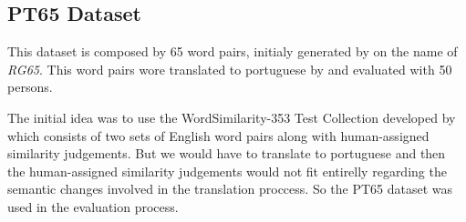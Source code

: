 \subsection{PT65 Dataset}\label{chap:methodsandmaterials:dataset}

This dataset is composed by 65 word pairs, initialy generated by  on the name of \textit{RG65}. This word pairs wore translated to portuguese by  and evaluated with 50 persons. 

The initial idea was to use the WordSimilarity-353 Test Collection developed by  which consists of two sets of English word pairs along with human-assigned similarity judgements. But we would have to translate to portuguese and then the human-assigned similarity judgements would not fit entirelly regarding the semantic changes involved in the translation proccess. So the PT65 dataset was used in the evaluation process.

























